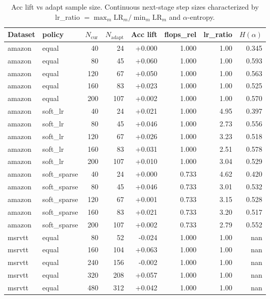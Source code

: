 \begin{table}[t]
\centering
\caption{Acc lift vs adapt sample size. Continuous next-stage step sizes characterized by lr\_ratio $=\max_m\mathrm{LR}_m/\min_m\mathrm{LR}_m$ and $\alpha$-entropy.}
\label{tab:agod-soft-lr-nsize}
\begin{tabular}{llrrrrrr}
\toprule
Dataset & policy & $N_{\mathrm{cur}}$ & $N_{\mathrm{adapt}}$ & Acc lift & flops\_rel & lr\_ratio & $H(\alpha)$ \\
\midrule
amazon & equal & 40 & 24 & +0.000 & 1.000 & 1.00 & 0.345 \\
amazon & equal & 80 & 45 & +0.060 & 1.000 & 1.00 & 0.593 \\
amazon & equal & 120 & 67 & +0.050 & 1.000 & 1.00 & 0.563 \\
amazon & equal & 160 & 83 & +0.023 & 1.000 & 1.00 & 0.525 \\
amazon & equal & 200 & 107 & +0.002 & 1.000 & 1.00 & 0.570 \\
amazon & soft\_lr & 40 & 24 & +0.021 & 1.000 & 4.95 & 0.397 \\
amazon & soft\_lr & 80 & 45 & +0.046 & 1.000 & 2.73 & 0.556 \\
amazon & soft\_lr & 120 & 67 & +0.026 & 1.000 & 3.23 & 0.518 \\
amazon & soft\_lr & 160 & 83 & +0.031 & 1.000 & 2.51 & 0.578 \\
amazon & soft\_lr & 200 & 107 & +0.010 & 1.000 & 3.04 & 0.529 \\
amazon & soft\_sparse & 40 & 24 & +0.000 & 0.733 & 4.62 & 0.420 \\
amazon & soft\_sparse & 80 & 45 & +0.046 & 0.733 & 3.01 & 0.532 \\
amazon & soft\_sparse & 120 & 67 & +0.001 & 0.733 & 3.15 & 0.528 \\
amazon & soft\_sparse & 160 & 83 & +0.021 & 0.733 & 3.20 & 0.517 \\
amazon & soft\_sparse & 200 & 107 & +0.002 & 0.733 & 2.79 & 0.552 \\
msrvtt & equal & 80 & 52 & -0.024 & 1.000 & 1.00 & nan \\
msrvtt & equal & 160 & 104 & +0.063 & 1.000 & 1.00 & nan \\
msrvtt & equal & 240 & 156 & -0.002 & 1.000 & 1.00 & nan \\
msrvtt & equal & 320 & 208 & +0.057 & 1.000 & 1.00 & nan \\
msrvtt & equal & 480 & 312 & +0.042 & 1.000 & 1.00 & nan \\

\end{tabular}
\end{table}
